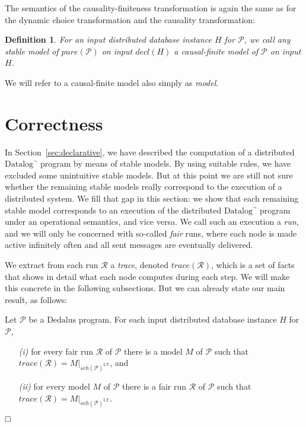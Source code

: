 \documentclass{tlp}
\newtheorem{definition}{Definition}[section]
\newcommand{\qed}{\hfill $\square$}
\newcommand{\langname}[1]{\text{#1}}  \newcommand{\pred}[1]{\mathtt{#1}}  \newcommand{\fname}[1]{\mathit{#1}}  \newcommand{\sq}[1]{`{#1}'}
\newcommand{\dedalus}{\langname{Dedalus}}
\newcommand{\datalogneg}{\langname{Datalog}^{\neg}}
\renewcommand{\qed}{$\hfill \square$}  \newcommand{\tline}{\hrulefill}
\newcommand{\ded}{\mathcal{P}}
\newcommand{\proj}[2]{#1|_{#2}}
\newcommand{\schof}[1]{\fname{sch}(#1)}
\newcommand{\toloct}[1]{#1^{\mathrm{LT}}}
\newcommand{\decl}[1]{\fname{decl}(#1)}
\newcommand{\pure}[1]{\fname{pure}(#1)}
\newcommand{\run}{\mathcal{R}}
\newcommand{\trace}[1]{\fname{trace}(#1)}
\begin{document}
The semantics of the causality-finiteness transformation is again
the same as for the dynamic choice transformation and the causality
transformation:

\begin{definition}For an input distributed database instance $H$
for $\ded$, we call any stable model of $\pure{\ded}$ on input $\decl H$
a \emph{causal-finite model} of $\ded$ on input $H$.\end{definition}We
will refer to a causal-finite model also simply as \emph{model}.


\section{Correctness}

\label{sec:operational}

In Section~\ref{sec:declarative}, we have described the computation
of a distributed $\datalogneg$ program by means of stable models.
By using suitable rules, we have excluded some unintuitive stable
models. But at this point we are still not sure whether the remaining
stable models really correspond to the execution of a distributed
system. We fill that gap in this section: we show that each remaining
stable model corresponds to an execution of the distributed $\datalogneg$
program under an operational semantics, and vice versa. We call such
an execution a \emph{run}, and we will only be concerned with so-called
\emph{fair} runs, where each node is made active infinitely often
and all sent messages are eventually delivered. 

We extract from each run $\run$ a \emph{trace}, denoted $\trace{\run}$,
which is a set of facts that shows in detail what each node computes
during each step. We will make this concrete in the following subsections.
But we can already state our main result, as follows:



\begin{theorem}\label{theorem:main}Let $\ded$ be a $\dedalus$
program. For each input distributed database instance $H$ for $\ded$,

\begin{enumerate}

\item[\emph{(i)}]for every fair run $\run$ of $\ded$ there is a
model $M$ of $\ded$ such that $\trace{\run}=\proj M{\toloct{\schof{\ded}}}$,
and

\item[\emph{(ii)}]for every model $M$ of $\ded$ there is a fair
run $\run$ of $\ded$ such that $\trace{\run}=\proj M{\toloct{\schof{\ded}}}$.

\end{enumerate}\qed\end{theorem}
\end{document}
